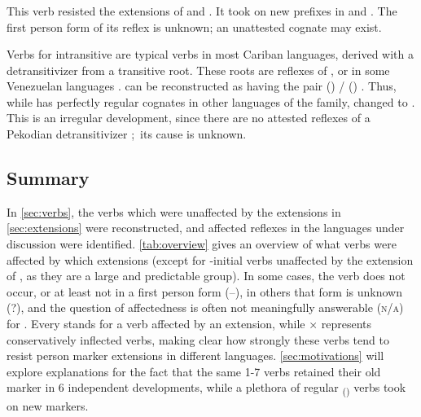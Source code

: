 \subsubsection{ }
\label{sec:bathe}
This verb resisted the extensions of \PPek {}  and \akuriyo {} .
It took on new  prefixes in \PTir {} and \PWai {}.
The first person form of its \carijo reflex  \parencites[72]{koch1908hiana} is unknown; an unattested \yukpa cognate may exist.

Verbs for intransitive  are typical  verbs in most Cariban languages, derived with a detransitivizer from a transitive root.
These roots are reflexes of , or  in some Venezuelan languages .
\PPek can be reconstructed as having the pair  () /  () .
Thus, while \PPek {} has perfectly regular cognates in other languages of the family,  changed  to .
This is an irregular development, since there are no attested reflexes of a Pekodian detransitivizer  \parencite[506]{meira2010origin}; its cause is unknown.




\subsection{Summary}
\label{sec:verbsummary}
In \cref{sec:verbs}, the verbs which were unaffected by the extensions in \cref{sec:extensions} were reconstructed, and affected reflexes in the languages under discussion were identified.
\cref{tab:overview} gives an overview of what verbs were affected by which extensions (except for -initial \akuriyo verbs unaffected by the extension of , as they are a large and predictable group).
In some cases, the verb does not occur, or at least not in a first person form (–), in others that form is unknown (?), and the question of affectedness is often not meaningfully answerable (\textsc{n/a}) for .
Every \checkmark stands for a verb affected by an extension, while × represents conservatively inflected verbs, making clear how strongly these verbs tend to resist person marker extensions in different languages.
\cref{sec:motivations} will explore explanations for the fact that the same 1-7 verbs retained their old  marker in 6 independent developments, while a plethora of regular \textsubscript{()} verbs took on new markers.

